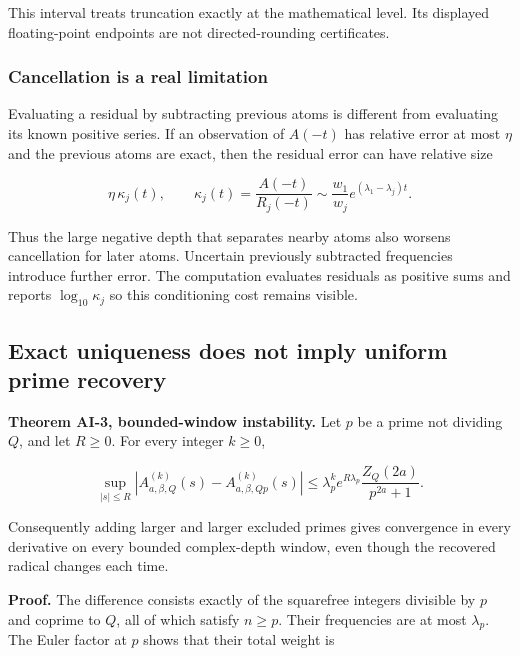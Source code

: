 This interval treats truncation exactly at the mathematical level. Its
displayed floating-point endpoints are not directed-rounding
certificates.

\hypertarget{cancellation-is-a-real-limitation}{%
\subsubsection{Cancellation is a real
limitation}\label{cancellation-is-a-real-limitation}}

Evaluating a residual by subtracting previous atoms is different from
evaluating its known positive series. If an observation of \(A(-t)\) has
relative error at most \(\eta\) and the previous atoms are exact, then
the residual error can have relative size

\[
 \eta\,\kappa_j(t),\qquad
 \kappa_j(t)=\frac{A(-t)}{R_j(-t)}
 \sim\frac{w_1}{w_j}e^{(\lambda_1-\lambda_j)t}.
\]

Thus the large negative depth that separates nearby atoms also worsens
cancellation for later atoms. Uncertain previously subtracted
frequencies introduce further error. The computation evaluates residuals
as positive sums and reports \(\log_{10}\kappa_j\) so this conditioning
cost remains visible.

\hypertarget{exact-uniqueness-does-not-imply-uniform-prime-recovery}{%
\subsection{Exact uniqueness does not imply uniform prime
recovery}\label{exact-uniqueness-does-not-imply-uniform-prime-recovery}}

\textbf{Theorem AI-3, bounded-window instability.} Let \(p\) be a prime
not dividing \(Q\), and let \(R\ge0\). For every integer \(k\ge0\),

\[
 \boxed{\displaystyle
 \sup_{|s|\le R}|A_{a,\beta,Q}^{(k)}(s)-A_{a,\beta,Qp}^{(k)}(s)|
 \le \lambda_p^k e^{R\lambda_p}
      \frac{Z_Q(2a)}{p^{2a}+1}.}
\]

Consequently adding larger and larger excluded primes gives convergence
in every derivative on every bounded complex-depth window, even though
the recovered radical changes each time.

\textbf{Proof.} The difference consists exactly of the squarefree
integers divisible by \(p\) and coprime to \(Q\), all of which satisfy
\(n\ge p\). Their frequencies are at most \(\lambda_p\). The Euler
factor at \(p\) shows that their total weight is

